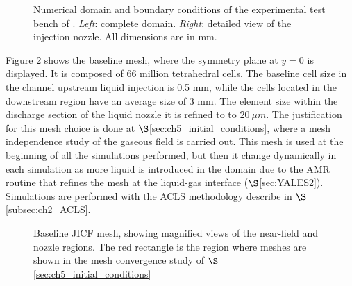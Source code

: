 \begin{figure}[ht]
     \centering
      \caption{Numerical domain and boundary conditions of the experimental test bench of . \textsl{Left}: complete domain. \textsl{Right}: detailed view of the injection nozzle. All dimensions are in mm.}
      \label{fig:numerical_setup_maquette_JICF_DLR}
\end{figure}


Figure \ref{fig:jicf_dlr_mesh} shows the baseline mesh, where the symmetry plane at $y = 0$ is displayed. It is composed of 66 million tetrahedral cells. The baseline cell size in the channel upstream liquid injection is 0.5 mm, while the cells located in the downstream region have an average size of 3 mm. The element size within the discharge section of the liquid nozzle it is refined to to $20~\mu m$. The justification for this mesh choice is done at $\S$\ref{sec:ch5_initial_conditions}, where a mesh independence study of the gaseous field is carried out. This mesh is used at the beginning of all the simulations performed, but then it change dynamically in each simulation as more liquid is introduced in the domain due to the AMR routine that refines the mesh at the liquid-gas interface ($\S$\ref{sec:YALES2}). Simulations are performed with the ACLS methodology describe in $\S$\ref{subsec:ch2_ACLS}.

\begin{figure}[h!]
	\centering
	\caption[Baseline JICF mesh, showing magnified views of the near-field and nozzle regions.]{Baseline JICF mesh, showing magnified views of the near-field and nozzle regions. The red rectangle is the region where meshes are shown in the mesh convergence study of $\S$\ref{sec:ch5_initial_conditions}}
	\label{fig:jicf_dlr_mesh}
\end{figure}



